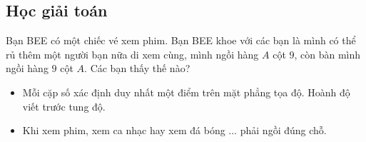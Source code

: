 \subsection{Học giải toán}
\begin{vd}%
Bạn BEE có một chiếc vé xem phim. Bạn BEE khoe với các bạn  là mình có thể rủ thêm một người bạn nữa di xem cùng, mình ngồi hàng $A$ cột $9$, còn bàn mình ngồi hàng $9$ cột $A$. Các bạn thấy thế nào?
\end{vd}
\begin{note} 
	\begin{itemize}
		\item Mỗi cặp số xác định duy nhất một điểm trên mặt phẳng tọa độ. Hoành độ viết trước tung độ.
		\item Khi xem phim, xem ca nhạc hay xem đá bóng $\ldots$ phải ngồi đúng chỗ. 
	\end{itemize}
\end{note}

